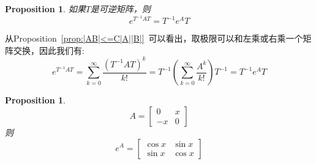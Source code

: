 \documentclass[a4paper,12pt]{ctexart}
\newenvironment{prooff}{{\noindent\it\textcolor{cyan!40!black}{Proof}:}\quad}{\par}
\newtheorem{prop}[defn]{Proposition}
\begin{document}
\begin{prop}
    \label{prop:e^{T^{-1}AT}=T^{-1}e^{A}T}
    如果$T$是可逆矩阵，则
    \begin{equation*}
        e^{T^{-1}AT}=T^{-1}e^{A}T
    \end{equation*}
\end{prop}
\begin{prooff}
    从Proposition~\ref{prop:|AB|<=C|A||B|}~可以看出，取极限可以和左乘或右乘一个矩阵交换，因此我们有:
    \begin{equation*}
        e^{T^{-1}AT}=\sum_{k=0}^{\infty}\frac{(T^{-1}AT)^k}{k!}=T^{-1}(\sum_{k=0}^{\infty}\frac{A^k}{k!})T^{-1}=T^{-1}e^{A}T
    \end{equation*}
\end{prooff}

\begin{prop}
    \begin{equation*}
        A=\begin{bmatrix}
            0  & x \\
            -x & 0
        \end{bmatrix}
    \end{equation*}
    则
    \begin{equation*}
        e^A=\begin{bmatrix}
            \cos x & \sin x \\
            \sin x & \cos x
        \end{bmatrix}
    \end{equation*}
\end{prop}
\end{document}
